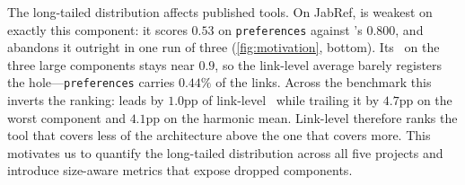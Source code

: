 The long-tailed distribution affects published tools.
On JabRef, \Artemis{} is weakest on exactly this component: it scores $0.53$ on \texttt{preferences} against \TransArc{}'s $0.800$, and abandons it outright in one run of three (\autoref{fig:motivation}, bottom).
Its \fone\ on the three large components stays near $0.9$, so the link-level average barely registers the hole---\texttt{preferences} carries $0.44\%$ of the links.
Across the benchmark this inverts the ranking: \Artemis{} leads \TransArc{} by $1.0$pp of link-level \fone\ while trailing it by $4.7$pp on the worst component and $4.1$pp on the harmonic mean.
Link-level \fone{} therefore ranks the tool that covers less of the architecture above the one that covers more.
This motivates us to quantify the long-tailed distribution across all five projects and introduce size-aware metrics
that expose dropped components.
